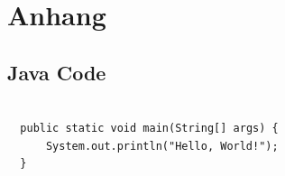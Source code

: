\section{Anhang} \label{sec:appendix}

\newenvironment{code}{\captionsetup{type=listing,labelformat=simple}}{}


\subsection*{Java Code} \label{app:code}

\begin{code}
\begin{verbatim}

  public static void main(String[] args) {
      System.out.println("Hello, World!");
  }
\end{verbatim}

\label{code:hello-world}
\end{code}
